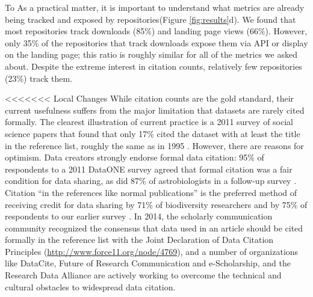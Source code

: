 \documentclass[english]{article}
\begin{document}
To 
As a practical matter, it is important to understand what metrics are already being tracked and exposed by repositories(Figure \ref{fig:results}d). 
We found that most repositories track downloads (85\%) and landing page views (66\%). 
However, only 35\% of the repositories that track downloads expose them via API or display on the landing page; this ratio is roughly similar for all of the metrics we asked about. 
Despite the extreme interest in citation counts, relatively few repositories (23\%) track them. 


<<<<<<< Local Changes
While citation counts are the gold standard, their current usefulness suffers from the major limitation that datasets are rarely cited formally.
The clearest illustration of current practice is a 2011 survey of social science papers that found that only 17\% cited the dataset with at least the title in the reference list, roughly the same as in 1995 
\cite{sieber_not_1995, mooney_citing_2011}. 
However, there are reasons for optimism.
Data creators strongly endorse formal data citation: 95\% of respondents to a 2011 DataONE survey agreed that formal citation was a fair condition for data sharing, as did 87\% of astrobiologists in a follow-up survey \cite{tenopir_data_2011, aydinoglu_data_2014}. 
Citation ``in the references like normal publications'' is the preferred method of receiving credit for data sharing by 71\% of biodiversity researchers and by 75\% of respondents to our earlier survey \cite{enke_users_2012, kratz_researcher_2015}.
In 2014, the scholarly communication community recognized the consensus that data used in an article should be cited formally in the reference list with the Joint Declaration of Data Citation Principles (\url{http://www.force11.org/node/4769}), and a number of organizations like DataCite, Future of Research Communication and e-Scholarship, and the Research Data Alliance are actively working to overcome the technical and cultural obstacles to widespread data citation.
\end{document}
